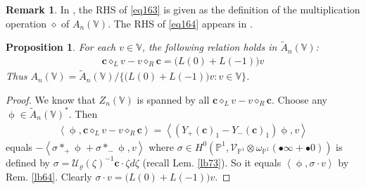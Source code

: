 \documentclass[11pt,b5paper,notitlepage]{article}
\theoremstyle{definition}
\newtheorem{rem}[df]{Remark}
\theoremstyle{plain}
\newtheorem{pp}[df]{Proposition}
\newcommand{\mc}{\mathcal}
\newcommand{\wtd}{\widetilde}
\newcommand{\scr}{\mathscr}
\newcommand{\blt}{\bullet}
\newcommand{\Vbb}{\mathbb V}
\newcommand{\Pbb}{\mathbb P}
\newcommand{\cbf}{\mathbf c}
\newcommand{\<}{\left\langle}
\renewcommand{\>}{\right\rangle}
\numberwithin{equation}{section}
\begin{document}
\begin{rem}
In \cite{DLM-Zhu}, the RHS of \eqref{eq163} is given as the definition of the multiplication operation $\diamond$ of $A_n(\Vbb)$. The RHS of \eqref{eq164} appears in \cite[Lem. 2.1-(ii)]{DLM-Zhu}.
\end{rem}



\begin{pp}
For each $v\in\Vbb$, the following relation holds in $\wtd A_n(\Vbb)$:
\begin{gather}
\cbf\diamond_L v-v\diamond_R\cbf=\big(L(0)+L(-1)\big)v
\end{gather}
Thus $A_n(\Vbb)=\wtd A_n(\Vbb)/\{\big(L(0)+L(-1)\big)v:v\in\Vbb\}$.
\end{pp}

\begin{proof}
We know that $Z_n(\Vbb)$ is spanned by all $\cbf\diamond_L v-v\diamond_R\cbf$. Choose any $\upphi\in\wtd A_n(\Vbb)^*$. Then
\begin{align*}
\<\upphi,\cbf\diamond_L v-v\diamond_R\cbf\>=\<(Y_+(\cbf)_1-Y_-(\cbf)_1)\upphi,v \>
\end{align*}
equals $-\<\sigma*_+\upphi+\sigma*_-\upphi,v\>$ where $\sigma\in H^0(\Pbb^1,\scr V_{\Pbb^1}\otimes\omega_{\Pbb^1}(\blt\infty+\blt 0))$ is defined by $\sigma=\mc U_\varrho(\zeta)^{-1}\cbf \cdot \zeta d\zeta$ (recall Lem. \ref{lb73}). So it equals $\<\upphi,\sigma\cdot v\>$ by Rem. \ref{lb64}. Clearly $\sigma\cdot v=\big(L(0)+L(-1)\big)v$.
\end{proof}








\printindex	
\footnotesize
	
%    
\end{document}
